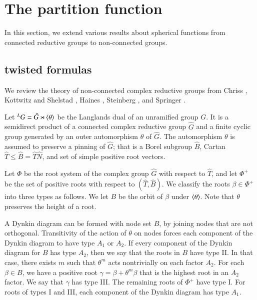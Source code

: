 \section{The partition function}


In this section, we extend various results about spherical functions
from connected reductive groups to non-connected groups.



\subsection{twisted formulas}

We review the theory of non-connected complex reductive groups from
 Chriss \cite{chriss}, Kottwitz and Shelstad \cite{kottwitz1999foundations}, 
Haines \cite{haines2016dualities},
Steinberg \cite{steinberg1968endomorphisms}, and Springer \cite{springer2010linear}.



Let ${}^LG = \hat G \rtimes \langle{\theta}\rangle$ be the Langlands dual of an unramified group $G$.
It is a semidirect product of a connected complex reductive group $\hat G$ and a finite cyclic group
generated by an outer automorphism $\theta$ of $\hat G$.  The automorphism $\theta$ is assumed
to preserve a pinning of $\hat G$; that is a Borel subgroup $\hat B$, Cartan $\hat T\le \hat B=\hat T\hat N$, and
set of simple positive root vectors.  

Let $\Phi$ be the root system of the complex group $\hat G$ with respect to $\hat T$, and let
$\Phi^+$ be the set of positive roots with respect to $(\hat T,\hat B)$.
 We classify the roots $\beta\in\Phi^+$ into three types as follows.  We let $B$ be the orbit of $\beta$ under
$\langle{\theta}\rangle$.  Note that $\theta$ preserves the height of a root.

A Dynkin diagram can be formed with node set $B$, by joining nodes that are not orthogonal.  
Transitivity of the action of $\theta$ on nodes forces each component of the Dynkin diagram to have type $A_1$
or $A_2$.  If every component of the Dynkin diagram for $B$  has type $A_2$, then we say that the roots in $B$
have type II.  In that case, there exists $m$ such that  $\theta^m$ acts nontrivially
on each factor $A_2$.   For each $\beta\in B$, we have a positive root $\gamma = \beta+\theta^m\beta$ that
is the highest root in an $A_2$ factor.  We say that $\gamma$ has type III.
The remaining roots of $\Phi^+$ have type I.  For roots of
types I and III, each component of the Dynkin diagram has type $A_1$.

